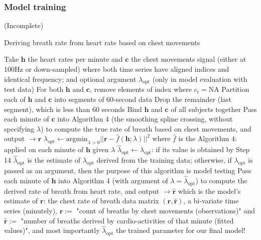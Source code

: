 \documentclass[
]{article}
\begin{document}
\hypertarget{model-training}{%
\subsubsection{Model training}\label{model-training}}

(Incomplete)

\begin{algorithm}
\caption{Deriving breath rate from heart rate based on chest movements}
\begin{algorithmic}[1]
\STATE Take $\mathbf{h}$ the heart rates per minute and $\mathbf{c}$ the chest movements signal (either at 100Hz or down-sampled) where both time series have aligned indices and identical frequency; and optional argument $\lambda_\text{opt}$ (only in model evaluation with test data)
\STATE For both $\mathbf{h}$ and $\mathbf{c}$, remove elements of index where $c_t = \text{NA}$
\STATE Partition each of $\mathbf{h}$ and $\mathbf{c}$ into segments of 60-second data
\ENDFOR
\STATE Drop the remainder (last segment), which is less than 60 seconds
\STATE Bind $\mathbf{h}$ and $\mathbf{c}$ of all subjects together
\ENDIF
{}
\STATE Pass each minute of $\mathbf{c}$ into Algorithm 4 (the smoothing spline crossing, without specifying $\lambda$) to compute the true rate of breath based on chest movements, and output $\rightarrow \mathbf{r}$
\ENDFOR
{}
\STATE $\lambda_\text{opt} \leftarrow \text{argmin}_{\lambda > 0} ||\mathbf{r} - \hat{f}(\mathbf{h}; \lambda)||^2$ where $\hat{f}$ is the Algorithm 4: applied on each minute of $\mathbf{h}$ given $\lambda$
\ENDIF
\STATE $\hat{\lambda}_\text{opt} \leftarrow \lambda_\text{opt}$: if its value is obtained by Step 14 $\hat{\lambda}_\text{opt}$ is the estimate of $\lambda_\text{opt}$ derived from the training data; otherwise, if $\lambda_\text{opt}$ is passed as an argument, then the purpose of this algorithm is model testing
\STATE Pass each minute of $\mathbf{h}$ into Algorithm 4 (with argument of $\lambda = \hat{\lambda}_\text{opt}$) to compute the derived rate of breath from heart rate, and output $\rightarrow \mathbf{\hat{r}}$ which is the model's estimate of $\mathbf{r}$: the chest rate of breath
\ENDFOR
\RETURN data matrix $(\mathbf{r}, \mathbf{\hat{r}})$, a bi-variate time series (minutely), $\mathbf{r} :=$ "count of breaths by chest movements (observations)" and $\mathbf{\hat{r}} :=$ "number of breaths derived by cardio-activities of that minute (fitted values)", and most importantly $\hat{\lambda}_\text{opt}$ the trained parameter for our final model!
\end{algorithmic}
\end{algorithm}
\end{document}
